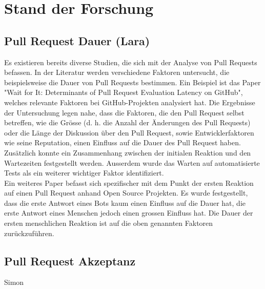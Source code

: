 


\chapter{Stand der Forschung} %

\label{Chapter3} %


\section{Pull Request Dauer (Lara)}
Es existieren bereits diverse Studien, die sich mit der Analyse von Pull Requests befassen. In der Literatur werden verschiedene Faktoren untersucht, die beispielsweise die Dauer von Pull Requests bestimmen. Ein Beispiel ist das Paper "Wait for It: Determinants of Pull Request Evaluation Latency on GitHub", welches relevante Faktoren bei GitHub-Projekten analysiert hat. Die Ergebnisse der Untersuchung legen nahe, dass die Faktoren, die den Pull Request selbst betreffen, wie die Grösse (d. h. die Anzahl der Änderungen des Pull Requests) oder die Länge der Diskussion über den Pull Request, sowie Entwicklerfaktoren wie seine Reputation, einen Einfluss auf die Dauer des Pull Request haben. Zusätzlich konnte ein Zusammenhang zwischen der initialen Reaktion und den Wartezeiten festgestellt werden. Ausserdem wurde das Warten auf automatisierte Tests als ein weiterer wichtiger Faktor identifiziert.\\
Ein weiteres Paper befasst sich spezifischer mit dem Punkt der ersten Reaktion auf einen Pull Request anhand Open Source Projekten. Es wurde festgestellt, dass die erste Antwort eines Bots kaum einen Einfluss auf die Dauer hat, die erste Antwort eines Menschen jedoch einen grossen Einfluss hat. Die Dauer der ersten menschlichen Reaktion ist auf die oben genannten Faktoren zurückzuführen.


\section{Pull Request Akzeptanz}
Simon
